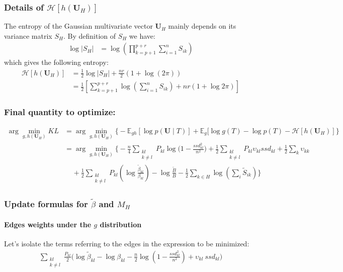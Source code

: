 \documentclass[11pt,a4paper]{article}
\newcommand{\argmin}{\arg\!\min}
\newcommand{\entr}{\mathcal{H}}
\newcommand{\Ubf}{\boldsymbol{U}}
\newcommand{\Esp}{\mathds{E}}
\begin{document}
 \subsubsection{Details of $\entr[h(\Ubf_H)]$}
 
 The entropy of the Gaussian multivariate vector $\Ubf_H$ mainly depends on its variance matrix $S_H$. By definition of $S_H$ we have:
 \begin{align*}
 \log |S_H| &= \log(\prod_{k=p+1}^{p+r} \sum_{i=1}^n S_{ik})
\end{align*}
which gives the following entropy:
\begin{align*}
\entr[h(\Ubf_H)]&= \frac{1}{2} \log |S_H| + \frac{nr}{2}(1+\log(2\pi))\\
 &=\frac{1}{2}\left[ \sum_{k=p+1}^{p+r} \log\left(\sum_{i=1}^n S_{ik}\right)+ nr(1+\log 2\pi )\right]
\end{align*}

\subsubsection{Final quantity to optimize:}
\begin{align*}
\argmin_{g,h(\Ubf_H)} KL  &=\argmin_{g,h(\Ubf_H)}  \Big\{-\Esp_{gh}[\log p(\Ubf \mid T) ] + \Esp_g[\log g(T) - \log p(T)-\entr[h(\Ubf_H)]\Big\}\\
&= \argmin_{g,h(\Ubf_H)}  \bigg\{- \frac{n}{4}\sum _{\substack{kl\\ k \neq l}} P_{kl} \log \Big(1-\frac{ssd_{kl}^2}{n^2}\Big) + \frac{1}{2}\sum_{\substack{kl\\ k \neq l}} P_{kl} \upsilon_{kl} ssd_{kl} + \frac{1}{2} \sum_{k} \upsilon_{kk} \\
& \;\;\;\; + \frac{1}{2}\sum_{\substack{kl\\ k\neq l}}P_{kl} \left(\log \frac{\widetilde{\beta}_{kl}}{{\beta}_{kl}}\right) - \log \frac{\widetilde{B}}{B} -\frac{1}{2}\sum_{k\in H} \log\left(\sum_i \widetilde{S}_{ik}\right) \bigg\}
\end{align*}
 
 
 \subsubsection{Update formulas for $\widetilde{\beta}$ and $M_H$ }

\paragraph{Edges weights under the $g$ distribution \\}
Let's isolate the terms referring to the edges in the expression to be minimized:
\begin{align*}
  \sum_{\substack{kl\\ k \neq l}} \frac{P_{kl}}{2}\Big(\log \widetilde{\beta}_{kl} - \log \beta_{kl} - \frac{n}{2} \log (1-\frac{ssd_{kl}^2}{n^2}) + \upsilon_{kl}\: ssd_{kl} \Big)   
\end{align*}
\end{document}
